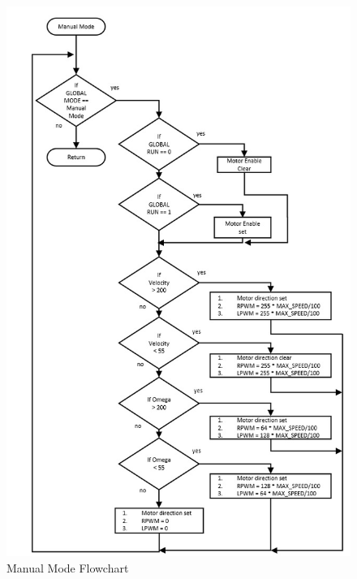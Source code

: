 \documentclass[MTRX3700report.tex]{subfiles}
\begin{document}
	\begin{figure}[h]
		\includegraphics[scale=0.8]{Manual_mode_flow.jpg}
		\centering
		\caption{Manual Mode Flowchart}
	\end{figure}
	
	
\end{document}
